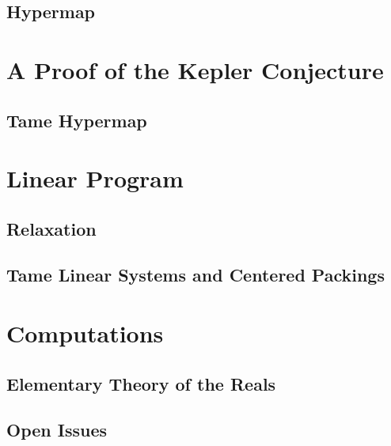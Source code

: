 \documentclass[onecolumn]{newsiambook}
\begin{document}
    \chapter{Hypermap}\label{chap:hypermap}
    



    \part{A Proof of the Kepler Conjecture}
    
    
    
    \chapter{Tame Hypermap}
    


    \part{Linear Program}
    \label{part:lp}
    \label{part:lprelax}
    \chapter{Relaxation}
    
    \chapter{Tame Linear Systems and Centered Packings}
    



    \part{Computations}
    \label{part:appendix}
    
    \chapter{Elementary Theory of the Reals}
     
    \chapter{Open Issues} %
    
\end{document}
